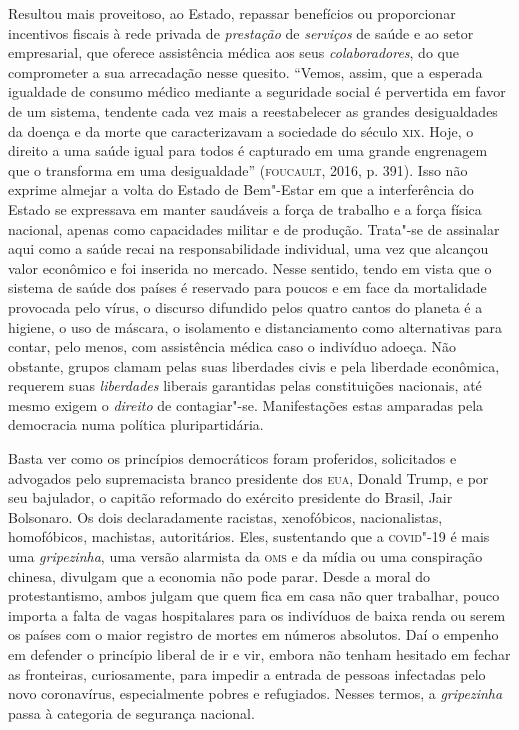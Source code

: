 Resultou mais proveitoso, ao Estado, repassar benefícios ou proporcionar
incentivos fiscais à rede privada de \emph{prestação} de \emph{serviços}
de saúde e ao setor empresarial, que oferece assistência médica aos seus
\emph{colaboradores}, do que comprometer a sua arrecadação nesse
quesito. ``Vemos, assim, que a esperada igualdade de consumo médico
mediante a seguridade social é pervertida em favor de um sistema,
tendente cada vez mais a reestabelecer as grandes desigualdades da
doença e da morte que caracterizavam a sociedade do século \textsc{xix}. Hoje, o
direito a uma saúde igual para todos é capturado em uma grande
engrenagem que o transforma em uma desigualdade'' (\textsc{foucault}, 2016, p.
391). Isso não exprime almejar a volta do Estado de Bem"-Estar em que a
interferência do Estado se expressava em manter saudáveis a força de
trabalho e a força física nacional, apenas como capacidades militar e de
produção. Trata"-se de assinalar aqui como a saúde recai na
responsabilidade individual, uma vez que alcançou valor econômico e foi
inserida no mercado. Nesse sentido, tendo em vista que o sistema de
saúde dos países é reservado para poucos e em face da mortalidade
provocada pelo vírus, o discurso difundido pelos quatro cantos do
planeta é a higiene, o uso de máscara, o isolamento e distanciamento
como alternativas para contar, pelo menos, com assistência médica caso o
indivíduo adoeça. Não obstante, grupos clamam pelas suas liberdades
civis e pela liberdade econômica, requerem suas \emph{liberdades}
liberais garantidas pelas constituições nacionais, até mesmo exigem o
\emph{direito} de contagiar"-se. Manifestações estas amparadas pela
democracia numa política pluripartidária.

Basta ver como os princípios democráticos foram proferidos, solicitados
e advogados pelo supremacista branco presidente dos \textsc{eua}, Donald Trump, e
por seu bajulador, o capitão reformado do exército presidente do Brasil,
Jair Bolsonaro. Os dois declaradamente racistas, xenofóbicos,
nacionalistas, homofóbicos, machistas, autoritários. Eles, sustentando
que a \textsc{covid}"-19 é mais uma \emph{gripezinha}, uma versão alarmista da \textsc{oms}
e da mídia ou uma conspiração chinesa, divulgam que a economia não pode
parar. Desde a moral do protestantismo, ambos julgam que quem fica em
casa não quer trabalhar, pouco importa a falta de vagas hospitalares
para os indivíduos de baixa renda ou serem os países com o maior
registro de mortes em números absolutos. Daí o empenho em defender o
princípio liberal de ir e vir, embora não tenham hesitado em fechar as
fronteiras, curiosamente, para impedir a entrada de pessoas infectadas
pelo novo coronavírus, especialmente pobres e refugiados. Nesses termos,
a \emph{gripezinha} passa à categoria de segurança nacional.

